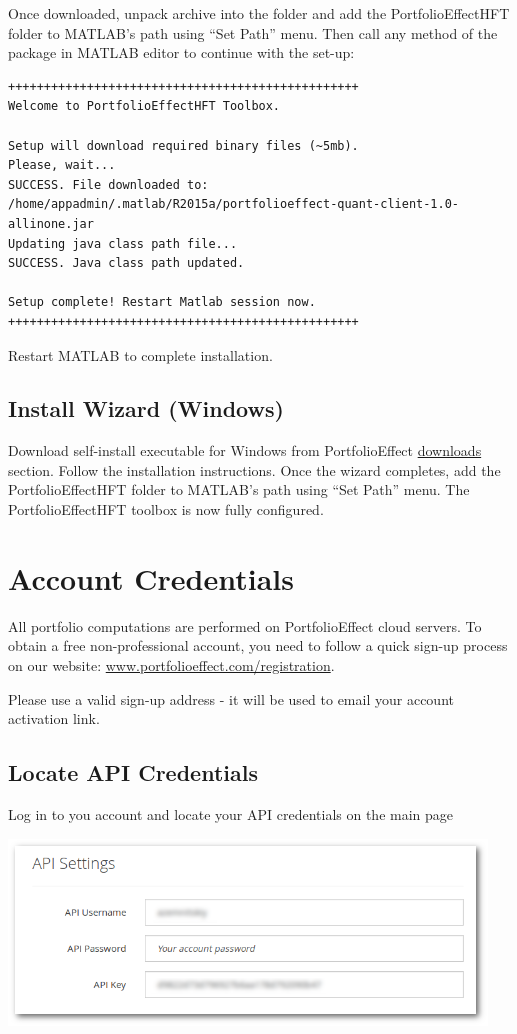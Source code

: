 \documentclass[letterpaper]{report}
\begin{document}
Once downloaded, unpack archive into the folder and add the 
PortfolioEffectHFT folder to MATLAB's path using ``Set Path'' menu. 
Then call any method of the package in
MATLAB editor to continue with the set-up:
\begin{lstlisting}
+++++++++++++++++++++++++++++++++++++++++++++++++
Welcome to PortfolioEffectHFT Toolbox.

Setup will download required binary files (~5mb).
Please, wait...
SUCCESS. File downloaded to: 
/home/appadmin/.matlab/R2015a/portfolioeffect-quant-client-1.0-allinone.jar
Updating java class path file...
SUCCESS. Java class path updated.

Setup complete! Restart Matlab session now.
+++++++++++++++++++++++++++++++++++++++++++++++++
\end{lstlisting}

Restart MATLAB to complete installation.

\section{Install Wizard (Windows)}
Download self-install executable for Windows from PortfolioEffect 
\href{https://www.portfolioeffect.com/docs/platform/quant/tools/matlab}{downloads}
section.
Follow the installation instructions. Once the wizard completes, add the 
PortfolioEffectHFT folder to MATLAB's path using ``Set Path''
menu.
The PortfolioEffectHFT toolbox is now fully configured. 

\chapter{Account Credentials}
All portfolio computations are performed on PortfolioEffect cloud servers.
To obtain a free non-professional account, you need to follow a quick sign-up
process on our website:
\href{https://www.portfolioeffect.com/registration}{www.portfolioeffect.com/registration}.\par
Please use a valid sign-up address - it will be used to email your
account activation link.

\section{Locate API Credentials} 
Log in to you account and locate your API credentials on the main page

\includegraphics[width=5in,natwidth=768,natheight=300]{img/api-settings.png}
 
\end{document}
